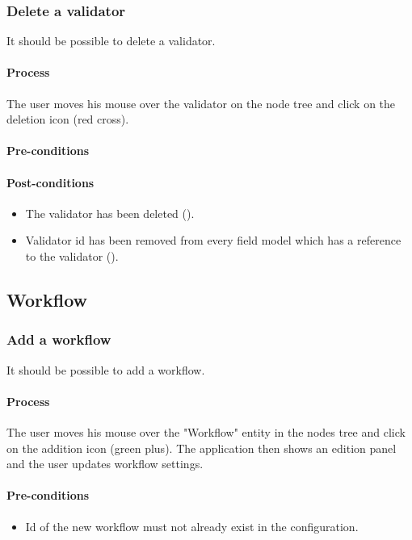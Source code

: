 \documentclass[11pt,a4paper,oneside]{article}
\begin{document}
\subsubsection{Delete a validator}
It should be possible to delete a validator.

\paragraph{Process}
The user moves his mouse over the validator on the node tree and click on the deletion icon (red cross).

\paragraph{Pre-conditions}

\paragraph{Post-conditions}
\begin{itemize}
	\item The validator has been deleted ().
	\item Validator id has been removed from every field model which has a reference to the validator ().
\end{itemize}

\subsection{Workflow}

\subsubsection{Add a workflow}
It should be possible to add a workflow.

\paragraph{Process}
The user moves his mouse over the "Workflow" entity in the nodes tree and click on the addition icon (green plus). The application then shows an edition panel and the user updates workflow settings.

\paragraph{Pre-conditions}
\begin{itemize}
	\item Id of the new workflow must not already exist in the configuration.
\end{itemize}
\end{document}
